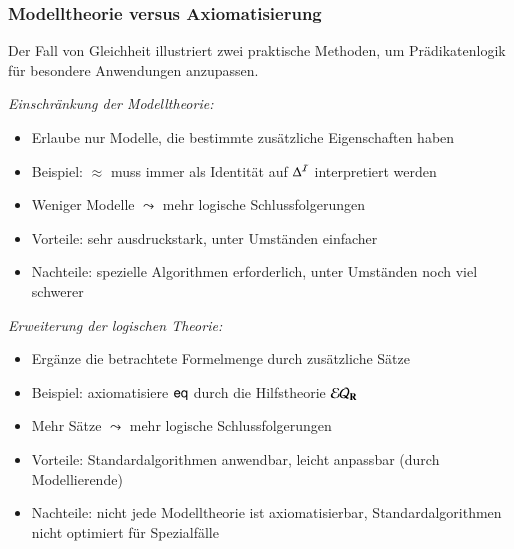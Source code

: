 \documentclass[aspectratio=1610,onlymath]{beamer}
\begin{document}
\begin{frame}\frametitle{Modelltheorie versus Axiomatisierung}

\alert{Der Fall von Gleichheit illustriert zwei praktische Methoden, um Prädikatenlogik für besondere Anwendungen anzupassen.}
\bigskip

\emph{Einschränkung der Modelltheorie:}
\begin{itemize}
\item Erlaube nur Modelle, die bestimmte zusätzliche Eigenschaften haben
\item Beispiel: $\approx$ muss immer als Identität auf $\Delta^{\mathcal{I}}$ interpretiert werden
\item Weniger Modelle $\leadsto$ mehr logische Schlussfolgerungen
\item Vorteile: sehr ausdruckstark, unter Umständen einfacher
\item Nachteile: spezielle Algorithmen erforderlich, unter Umständen noch viel schwerer
\end{itemize}\bigskip

\emph{Erweiterung der logischen Theorie:}
\begin{itemize}
\item Ergänze die betrachtete Formelmenge durch zusätzliche Sätze
\item Beispiel: axiomatisiere $\textsf{eq}$ durch die Hilfstheorie $\mathcal{EQ}_{\textbf{\textcolor{black}{R}}}$
\item Mehr Sätze $\leadsto$ mehr logische Schlussfolgerungen
\item Vorteile: Standardalgorithmen anwendbar, leicht anpassbar (durch Modellierende)
\item Nachteile: nicht jede Modelltheorie ist axiomatisierbar, Standardalgorithmen nicht optimiert für Spezialfälle
\end{itemize}

\end{frame}
\end{document}
